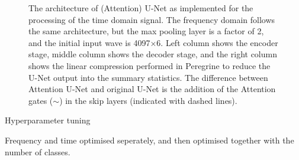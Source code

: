 \begin{appendices}
\begin{figure}[htb]
\begin{tikzpicture}[node distance=1.0cm]
	\end{tikzpicture}	
 
\caption{The architecture of (Attention) U-Net as implemented for the processing of the time domain signal. The frequency domain follows the same architecture, but the max pooling layer is a factor of 2, and the initial input wave is 4097$\times$6. Left column shows the encoder stage, middle column shows the decoder stage, and the right column shows the linear compression performed in Peregrine to reduce the U-Net output into the summary statistics. The difference between Attention U-Net and original U-Net is the addition of the Attention gates ($\sim$) in the skip layers (indicated with dashed lines).}
\label{fig:Attention_UNet_arch}
 \end{figure}

Hyperparameter tuning

Frequency and time optimised seperately, and then optimised together with the number of classes.


\end{appendices}
